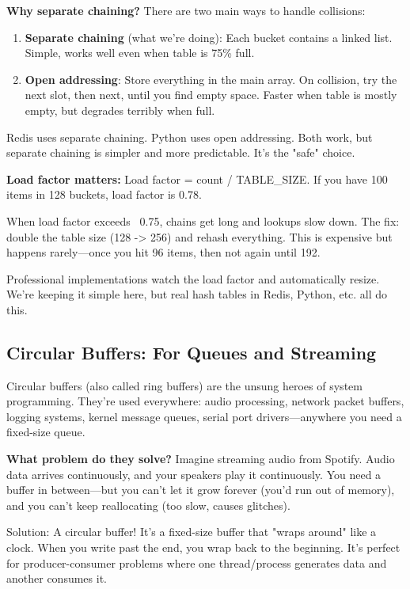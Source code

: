 \begin{notebox}
\textbf{Why separate chaining?} There are two main ways to handle collisions:

\begin{enumerate}
    \item \textbf{Separate chaining} (what we're doing): Each bucket contains a linked list. Simple, works well even when table is 75\% full.

    \item \textbf{Open addressing}: Store everything in the main array. On collision, try the next slot, then next, until you find empty space. Faster when table is mostly empty, but degrades terribly when full.
\end{enumerate}

Redis uses separate chaining. Python uses open addressing. Both work, but separate chaining is simpler and more predictable. It's the "safe" choice.

\textbf{Load factor matters:} Load factor = count / TABLE\_SIZE. If you have 100 items in 128 buckets, load factor is 0.78.

When load factor exceeds ~0.75, chains get long and lookups slow down. The fix: double the table size (128 -> 256) and rehash everything. This is expensive but happens rarely---once you hit 96 items, then not again until 192.

Professional implementations watch the load factor and automatically resize. We're keeping it simple here, but real hash tables in Redis, Python, etc. all do this.
\end{notebox}

\subsection{Circular Buffers: For Queues and Streaming}

Circular buffers (also called ring buffers) are the unsung heroes of system programming. They're used everywhere: audio processing, network packet buffers, logging systems, kernel message queues, serial port drivers---anywhere you need a fixed-size queue.

\textbf{What problem do they solve?} Imagine streaming audio from Spotify. Audio data arrives continuously, and your speakers play it continuously. You need a buffer in between---but you can't let it grow forever (you'd run out of memory), and you can't keep reallocating (too slow, causes glitches).

Solution: A circular buffer! It's a fixed-size buffer that "wraps around" like a clock. When you write past the end, you wrap back to the beginning. It's perfect for producer-consumer problems where one thread/process generates data and another consumes it.

